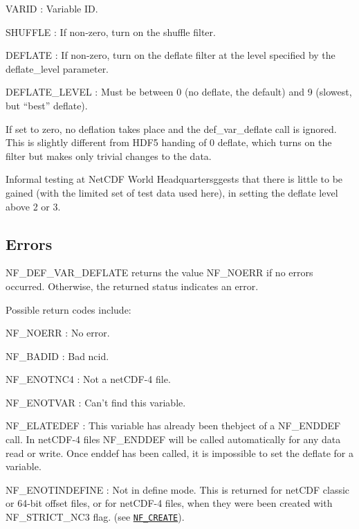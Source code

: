 {\ttfamily V\+A\+R\+ID} \+: Variable ID.

{\ttfamily S\+H\+U\+F\+F\+LE} \+: If non-\/zero, turn on the shuffle filter.

{\ttfamily D\+E\+F\+L\+A\+TE} \+: If non-\/zero, turn on the deflate filter at the level specified by the deflate\+\_\+level parameter.

{\ttfamily D\+E\+F\+L\+A\+T\+E\+\_\+\+L\+E\+V\+EL} \+: Must be between 0 (no deflate, the default) and 9 (slowest, but “best” deflate).

If set to zero, no deflation takes place and the def\+\_\+var\+\_\+deflate call is ignored. This is slightly different from H\+D\+F5 handing of 0 deflate, which turns on the filter but makes only trivial changes to the data.

Informal testing at Net\+C\+DF World Headquartersggests that there is little to be gained (with the limited set of test data used here), in setting the deflate level above 2 or 3.

\subsection*{Errors }

N\+F\+\_\+\+D\+E\+F\+\_\+\+V\+A\+R\+\_\+\+D\+E\+F\+L\+A\+TE returns the value N\+F\+\_\+\+N\+O\+E\+RR if no errors occurred. Otherwise, the returned status indicates an error.

Possible return codes include\+:

{\ttfamily N\+F\+\_\+\+N\+O\+E\+RR} \+: No error.

{\ttfamily N\+F\+\_\+\+B\+A\+D\+ID} \+: Bad ncid.

{\ttfamily N\+F\+\_\+\+E\+N\+O\+T\+N\+C4} \+: Not a net\+C\+D\+F-\/4 file.

{\ttfamily N\+F\+\_\+\+E\+N\+O\+T\+V\+AR} \+: Can’t find this variable.

{\ttfamily N\+F\+\_\+\+E\+L\+A\+T\+E\+D\+EF} \+: This variable has already been thebject of a N\+F\+\_\+\+E\+N\+D\+D\+EF call. In net\+C\+D\+F-\/4 files N\+F\+\_\+\+E\+N\+D\+D\+EF will be called automatically for any data read or write. Once enddef has been called, it is impossible to set the deflate for a variable.

{\ttfamily N\+F\+\_\+\+E\+N\+O\+T\+I\+N\+D\+E\+F\+I\+NE} \+: Not in define mode. This is returned for net\+C\+DF classic or 64-\/bit offset files, or for net\+C\+D\+F-\/4 files, when they were been created with N\+F\+\_\+\+S\+T\+R\+I\+C\+T\+\_\+\+N\+C3 flag. (see \href{#NF_005fCREATE}{\tt N\+F\+\_\+\+C\+R\+E\+A\+TE}).

